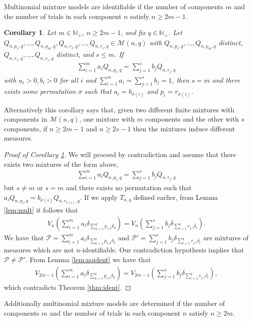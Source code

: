\documentclass[aos,preprint]{imsart}
\def\nn{\mathbb{N}}
\def\sM{\pazocal{M}}
\def\sP{\mathscr{P}}
\def\sM{\mathscr{M}}
\theoremstyle{plain}
\newtheorem{cor}{Corollary}[section]
\theoremstyle{defintion}
\begin{document}
Multinomial mixture models are identifiable if the number of components $m$ and the number of trials in each component $n$ satisfy $n\ge 2m-1$.
\begin{cor}\label{cor:multident}
	Let $m\in \nn_+$, $n\ge2m-1$, and fix $q\in \nn_+$. Let $Q_{n,p_1,q},\ldots,Q_{n,p_m,q}, Q_{n,r_1,q},\ldots,Q_{n,r_s,q} \in \sM\left( n,q \right)$ with $Q_{n,p_1,q},\ldots,Q_{n,p_m,q}$ distinct, $Q_{n,r_1,q},\ldots,Q_{n,r_s,q}$ distinct, and $s\le m$. If
	\begin{eqnarray*}
		\sum_{i=1}^m a_i Q_{n,p_i,q} = \sum_{j=1}^s b_j Q_{n,r_j,q}
	\end{eqnarray*} 
	with $a_i>0,b_i> 0$ for all $i$ and $\sum_{i=1}^m a_i = \sum_{j=1}^s b_j = 1$, then $s = m$ and there exists some permutation $\sigma$ such that $a_i = b_{\sigma(i)}$ and $p_i = r_{\sigma(i)}$.
\end{cor}
Alternatively this corollary says that, given two different finite mixtures with components in $\sM(n,q)$, one mixture with $m$ components and the other with $s$ components, if $n\ge 2m-1$ and $n\ge 2s-1$ then the mixtures induce different measures.
\begin{proof}[Proof of Corollary \ref{cor:multident}]
	We will proceed by contradiction and assume that there exists two mixtures of the form above,
	\begin{eqnarray*}
		\sum_{i=1}^m a_i Q_{n,p_i,q} = \sum_{j=1}^s b_j Q_{n,r_j,q}
	\end{eqnarray*} 
	but $s\neq m$ or $s=m$ and there exists no permutation such that $a_i Q_{n,p_i,q} = b_{\sigma\left( i \right)} Q_{ n,r_{\sigma\left( i \right)},q}$. 
	If we apply $T_{n,q}$ defined earlier, from Lemma \ref{lem:mult} it follows that
	\begin{eqnarray*}
		V_n\left(\sum_{i=1}^{m} a_i \delta_{\sum_{k=1}^q p_{i,k} \delta_k} \right) = V_n\left(\sum_{j=1}^{s} b_j \delta_{\sum_{l=1}^q r_{j,l} \delta_l} \right).
	\end{eqnarray*}
	We have that $\sP = \sum_{i=1}^{m} a_i \delta_{\sum_{k=1}^q p_{i,k} \delta_k}$ and $\sP' = \sum_{j=1}^{s} b_j \delta_{\sum_{l=1}^q r_{j,l} \delta_l}$ are mixtures of measures which are not $n$-identifiable. Our contradiction hypothesis implies that $\sP \neq \sP'$. From Lemma \ref{lem:noident} we have that 
	\begin{eqnarray*}
		V_{2m-1}\left(\sum_{i=1}^{m} a_i \delta_{\sum_{k=1}^q p_{i,k} \delta_k} \right) = V_{2m-1}\left(\sum_{j=1}^{s} b_j \delta_{\sum_{l=1}^q r_{j,l} \delta_l} \right),
	\end{eqnarray*}
	which contradicts Theorem \ref{thm:ident}.
\end{proof}
Additionally multinomial mixture models are determined if the number of components $m$ and the number of trials in each component $n$ satisfy $n\ge 2m$.
\end{document}
